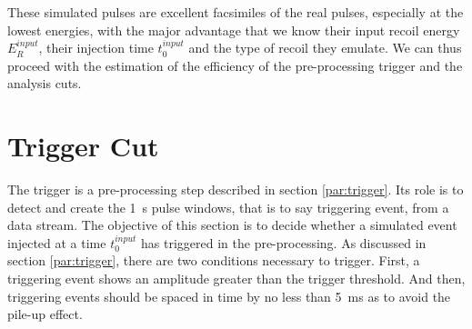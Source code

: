 These simulated pulses are excellent facsimiles of the real pulses, especially at the lowest energies, with the major advantage that we know their input recoil energy $E_R^{input}$, their injection time $t_0^{input}$ and the type of recoil they emulate. We can thus proceed with the estimation of the efficiency of the pre-processing trigger and the analysis cuts.



\section{Trigger Cut}
\label{par:trigger-cut}

The trigger is a pre-processing step described in section \ref{par:trigger}. Its role is to detect and create the \SI{1}{\s} pulse windows, that is to say triggering event, from a data stream. The objective of this section is to decide whether a simulated event injected at a time $t_0^{input}$ has triggered in the pre-processing. As discussed in section \ref{par:trigger}, there are two conditions necessary to trigger. First, a triggering event shows an amplitude greater than the trigger threshold. And then, triggering events should be spaced in time by no less than \SI{5}{\milli\s} as to avoid the pile-up effect.

